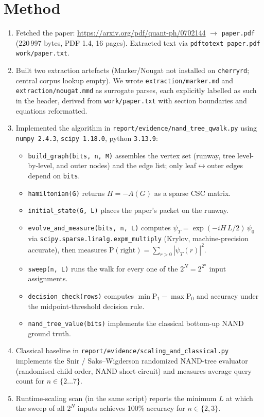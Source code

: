 \documentclass[11pt]{article}
\begin{document}
\section{Method}
\begin{enumerate}
\item Fetched the paper:
\url{https://arxiv.org/pdf/quant-ph/0702144} $\to$ \verb|paper.pdf| (220\,997
bytes, PDF 1.4, 16 pages). Extracted text via
\verb|pdftotext paper.pdf work/paper.txt|.
\item Built two extraction artefacts (Marker/Nougat not installed on
\texttt{cherryrd}; central corpus lookup empty). We wrote
\verb|extraction/marker.md| and \verb|extraction/nougat.mmd| as surrogate
parses, each explicitly labelled as such in the header, derived from
\verb|work/paper.txt| with section boundaries and equations reformatted.
\item Implemented the algorithm in
\verb|report/evidence/nand_tree_qwalk.py| using \texttt{numpy 2.4.3},
\texttt{scipy 1.18.0}, python \texttt{3.13.9}:
  \begin{itemize}
    \item \verb|build_graph(bits, n, M)| assembles the vertex set (runway,
          tree level-by-level, and outer nodes) and the edge list;
          only leaf$\leftrightarrow$outer edges depend on \texttt{bits}.
    \item \verb|hamiltonian(G)| returns $H = -A(G)$ as a sparse CSC matrix.
    \item \verb|initial_state(G, L)| places the paper's packet on the runway.
    \item \verb|evolve_and_measure(bits, n, L)| computes
          $\psi_T = \exp(-i H\,L/2)\,\psi_0$ via
          \verb|scipy.sparse.linalg.expm_multiply| (Krylov, machine-precision
          accurate), then measures $\mathrm P(\text{right}) = \sum_{r>0}
          |\psi_T(r)|^{2}$.
    \item \verb|sweep(n, L)| runs the walk for every one of the $2^{N}=2^{2^n}$
          input assignments.
    \item \verb|decision_check(rows)| computes
          $\min \mathrm P_1 - \max \mathrm P_0$ and accuracy under the
          midpoint-threshold decision rule.
    \item \verb|nand_tree_value(bits)| implements the classical
          bottom-up NAND ground truth.
  \end{itemize}
\item Classical baseline in
\verb|report/evidence/scaling_and_classical.py| implements the Snir /
Saks--Wigderson randomized NAND-tree evaluator (randomised child order,
NAND short-circuit) and measures average query count for $n\in\{2\ldots 7\}$.
\item Runtime-scaling scan (in the same script) reports the minimum $L$ at
which the sweep of all $2^{N}$ inputs achieves 100\% accuracy for $n\in\{2,3\}$.
\end{enumerate}
\end{document}
